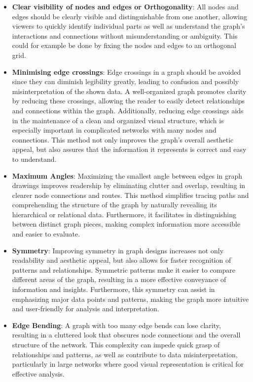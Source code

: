 \documentclass[bachelor, english]{algothesis}
\begin{document}
\begin{itemize}
    \item \textbf{Clear visibility of nodes and edges or Orthogonality}: All nodes and edges should be clearly visible and distinguishable from one another, allowing viewers to quickly identify individual parts as well as understand the graph's interactions and connections without misunderstanding or ambiguity. This could for example be done by fixing the nodes and edges to an orthogonal grid.
    \item \textbf{Minimising edge crossings}: Edge crossings in a graph should be avoided since they can diminish legibility greatly, leading to confusion and possibly misinterpretation of the shown data. A well-organized graph promotes clarity by reducing these crossings, allowing the reader to easily detect relationships and connections within the graph. Additionally, reducing edge crossings aids in the maintenance of a clean and organized visual structure, which is especially important in complicated networks with many nodes and connections. This method not only improves the graph's overall aesthetic appeal, but also assures that the information it represents is correct and easy to understand.
    \item \textbf{Maximum Angles}: Maximizing the smallest angle between edges in graph drawings improves readership by eliminating clutter and overlap, resulting in clearer node connections and routes. This method simplifies tracing paths and comprehending the structure of the graph by naturally revealing its hierarchical or relational data. Furthermore, it facilitates in distinguishing between distinct graph pieces, making complex information more accessible and easier to evaluate.
    \item \textbf{Symmetry}: Improving symmetry in graph designs increases not only readability and aesthetic appeal, but also allows for faster recognition of patterns and relationships. Symmetric patterns make it easier to compare different areas of the graph, resulting in a more effective conveyance of information and insights. Furthermore, this symmetry can assist in emphasizing major data points and patterns, making the graph more intuitive and user-friendly for analysis and interpretation.
    \item \textbf{Edge Bending}: A graph with too many edge bends can lose clarity, resulting in a cluttered look that obscures node connections and the overall structure of the network. This complexity can impede quick grasp of relationships and patterns, as well as contribute to data misinterpretation, particularly in large networks where good visual representation is critical for effective analysis.
\end{itemize}
\end{document}
